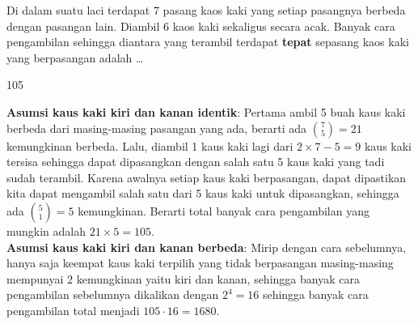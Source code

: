 \begin{soalbaru}
Di dalam suatu laci terdapat 7 pasang kaos kaki yang setiap pasangnya berbeda dengan pasangan lain. Diambil 6 kaos kaki sekaligus secara acak. Banyak cara pengambilan sehingga diantara yang terambil terdapat \textbf{tepat} sepasang kaos kaki yang berpasangan adalah \dots
\end{soalbaru}
\begin{jawaban}
105
\end{jawaban}
\begin{solusi}
\textbf{Asumsi kaus kaki kiri dan kanan identik}: Pertama ambil 5 buah kaus kaki berbeda dari masing-masing pasangan yang ada, berarti ada ${7 \choose 5} = 21$ kemungkinan berbeda. Lalu, diambil 1 kaus kaki lagi dari $2 \times 7 - 5 = 9$ kaus kaki tersisa sehingga dapat dipasangkan dengan salah satu 5 kaus kaki yang tadi sudah terambil. Karena awalnya setiap kaus kaki berpasangan, dapat dipastikan kita dapat mengambil salah satu dari 5 kaus kaki untuk dipasangkan, sehingga ada ${5 \choose 1}=5$ kemungkinan. Berarti total banyak cara pengambilan yang mungkin adalah $21 \times 5 = \boxed{105}$.\\
\textbf{Asumsi kaus kaki kiri dan kanan berbeda}: Mirip dengan cara sebelumnya, hanya saja keempat kaus kaki terpilih yang tidak berpasangan masing-masing mempunyai 2 kemungkinan yaitu kiri dan kanan, sehingga banyak cara pengambilan sebelumnya dikalikan dengan $2^4 = 16$ sehingga banyak cara pengambilan total menjadi $105 \cdot 16 = \boxed{1680}$.
\end{solusi}

